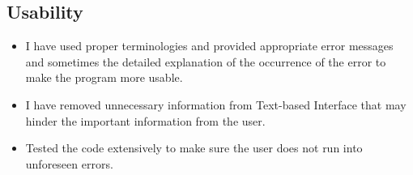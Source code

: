\documentclass[a4paper,12pt]{article}
\begin{document}
\subsection{Usability}
\begin{itemize}
	\item I have used proper terminologies and provided appropriate error messages and sometimes the detailed explanation of the occurrence of the error to make the program more usable.
	\item I have removed unnecessary information from Text-based Interface that may hinder the important information from the user.
	\item Tested the code extensively to make sure the user does not run into unforeseen errors.
\end{itemize}
\end{document}
